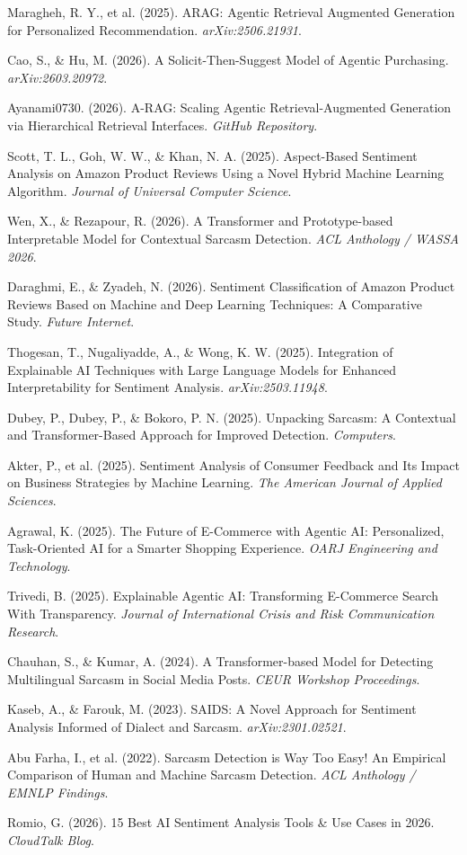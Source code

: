 \documentclass[11pt,oneside]{scrbook}
\begin{document}
\begin{enumerate}[label={[\arabic*]}]
\item Maragheh, R. Y., et al. (2025). ARAG: Agentic Retrieval Augmented Generation for Personalized Recommendation. \textit{arXiv:2506.21931}.
\item Cao, S., \& Hu, M. (2026). A Solicit-Then-Suggest Model of Agentic Purchasing. \textit{arXiv:2603.20972}.
\item Ayanami0730. (2026). A-RAG: Scaling Agentic Retrieval-Augmented Generation via Hierarchical Retrieval Interfaces. \textit{GitHub Repository}.
\item Scott, T. L., Goh, W. W., \& Khan, N. A. (2025). Aspect-Based Sentiment Analysis on Amazon Product Reviews Using a Novel Hybrid Machine Learning Algorithm. \textit{Journal of Universal Computer Science}.
\item Wen, X., \& Rezapour, R. (2026). A Transformer and Prototype-based Interpretable Model for Contextual Sarcasm Detection. \textit{ACL Anthology / WASSA 2026}.
\item Daraghmi, E., \& Zyadeh, N. (2026). Sentiment Classification of Amazon Product Reviews Based on Machine and Deep Learning Techniques: A Comparative Study. \textit{Future Internet}.
\item Thogesan, T., Nugaliyadde, A., \& Wong, K. W. (2025). Integration of Explainable AI Techniques with Large Language Models for Enhanced Interpretability for Sentiment Analysis. \textit{arXiv:2503.11948}.
\item Dubey, P., Dubey, P., \& Bokoro, P. N. (2025). Unpacking Sarcasm: A Contextual and Transformer-Based Approach for Improved Detection. \textit{Computers}.
\item Akter, P., et al. (2025). Sentiment Analysis of Consumer Feedback and Its Impact on Business Strategies by Machine Learning. \textit{The American Journal of Applied Sciences}.
\item Agrawal, K. (2025). The Future of E-Commerce with Agentic AI: Personalized, Task-Oriented AI for a Smarter Shopping Experience. \textit{OARJ Engineering and Technology}.
\item Trivedi, B. (2025). Explainable Agentic AI: Transforming E-Commerce Search With Transparency. \textit{Journal of International Crisis and Risk Communication Research}.
\item Chauhan, S., \& Kumar, A. (2024). A Transformer-based Model for Detecting Multilingual Sarcasm in Social Media Posts. \textit{CEUR Workshop Proceedings}.
\item Kaseb, A., \& Farouk, M. (2023). SAIDS: A Novel Approach for Sentiment Analysis Informed of Dialect and Sarcasm. \textit{arXiv:2301.02521}.
\item Abu Farha, I., et al. (2022). Sarcasm Detection is Way Too Easy! An Empirical Comparison of Human and Machine Sarcasm Detection. \textit{ACL Anthology / EMNLP Findings}.
\item Romio, G. (2026). 15 Best AI Sentiment Analysis Tools \& Use Cases in 2026. \textit{CloudTalk Blog}.
\end{enumerate}
\end{document}
